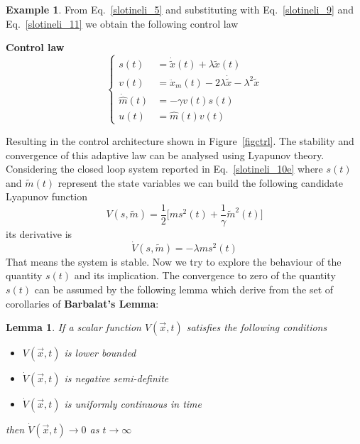 \documentclass[11pt,a4paper,oneside]{book}
\numberwithin{equation}{section}
\theoremstyle{it}
\newtheorem{lemma}{Lemma}[chapter]
\theoremstyle{definition}
\newtheorem{example}{Example}[chapter]
\begin{document}
\begin{example}
	From Eq.~\ref{slotineli_5} and substituting with Eq.~\ref{slotineli_9} and Eq.~\ref{slotineli_11}	we obtain the following control law
	\begin{mybox}
		\textbf{Control law}
		\begin{equation}\label{slotineli_12}
			\left\lbrace \begin{aligned}
				s(t) &= \dot{\tilde{x}}(t)+\lambda\tilde{x}(t) \\[6pt]
				v(t) &= \ddot{x}_m(t)-2\lambda\dot{\tilde{x}}-\lambda^2\tilde{x} \\[6pt]
				\dot{\hat{m}}(t) &= -\gamma v(t) s(t) \\[6pt]
				u(t) &= \hat{m}(t)v(t)
			\end{aligned}\right. 
		\end{equation}
		\vspace{0mm}
	\end{mybox}
	Resulting in the control architecture shown in Figure~\ref{figctrl}.
	The stability and convergence of this adaptive law can be analysed using Lyapunov theory. Considering the closed loop system reported in Eq.~\ref{slotineli_10e} where $s(t)$ and $\tilde{m}(t)$ represent the state variables we can build the following candidate Lyapunov function
	\begin{equation}
		V(s,\tilde{m}) = \frac{1}{2}\Bigg[ms^2(t)+\frac{1}{\gamma}\tilde{m}^2(t)\Bigg]
	\end{equation}
	its derivative is
	\begin{equation}
		\dot{V}(s,\tilde{m}) = -\lambda m s^2(t)
	\end{equation}
	That means the system is stable. Now we try to explore the behaviour of the quantity $s(t)$ and its implication. The convergence to zero of the quantity $s(t)$ can be assumed by the following lemma which derive from the set of corollaries of  \textbf{Barbalat's Lemma}:
	\begin{lemma}
		If a scalar function $V(\vec{x},t)$ satisfies the following conditions
		\begin{itemize}
			\item $V(\vec{x},t)$ is lower bounded
			\item $\dot{V}(\vec{x},t)$ is negative semi-definite
			\item $\dot{V}(\vec{x},t)$ is uniformly continuous in time
		\end{itemize}
		then $\dot{V}(\vec{x},t) \rightarrow 0$ as $t\rightarrow \infty$
	\end{lemma} 
	\begin{figure}[H]

\end{figure}
\end{example}
\end{document}
